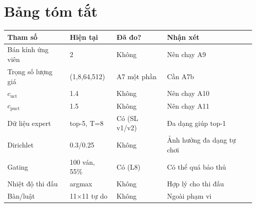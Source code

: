 \section{Bảng tóm tắt}
\begin{small}
\begin{longtable}{@{}p{} p{} p{} p{}@{}}
\toprule
\textbf{Tham số} & \textbf{Hiện tại} & \textbf{Đã đo?} & \textbf{Nhận xét} \\
\midrule
Bán kính ứng viên & 2 & Không & Nên chạy A9 \\
Trọng số lượng giá & (1,8,64,512) & A7 một phần & Cần A7b \\
$c_{\text{uct}}$ & 1.4 & Không & Nên chạy A10 \\
$c_{\text{puct}}$ & 1.5 & Không & Nên chạy A11 \\
Dữ liệu expert & top-5, T=8 & Có (SL v1/v2) & Đa dạng giúp top-1 \\
Dirichlet & 0.3/0.25 & Không & Ảnh hưởng đa dạng tự chơi \\
Gating & 100 ván, 55\% & Có (L8) & Có thể quá bảo thủ \\
Nhiệt độ thi đấu & argmax & Không & Hợp lý cho thi đấu \\
Bàn/luật & 11×11 tự do & Không & Ngoài phạm vi \\
\bottomrule
\end{longtable}
\end{small}